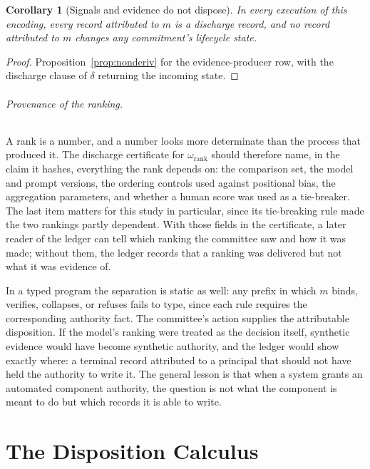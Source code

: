 \documentclass[11pt,openany]{book}
\newtheorem{corollary}[theorem]{Corollary}
\theoremstyle{remark}
\begin{document}
\begin{corollary}[Signals and evidence do not dispose]\label{prop:signals}
In every execution of this encoding, every record attributed to $m$ is a
discharge record, and no record attributed to $m$ changes any
commitment's lifecycle state.
\end{corollary}

\begin{proof}
Proposition~\ref{prop:nonderiv} for the evidence-producer row, with the
discharge clause of $\delta$ returning the incoming state.
\end{proof}

\paragraph{Provenance of the ranking.} A rank is a number, and a number
looks more determinate than the process that produced it. The discharge
certificate for $\omega_{\mathrm{rank}}$ should therefore name, in the
claim it hashes, everything the rank depends on: the comparison set, the
model and prompt versions, the ordering controls used against positional
bias, the aggregation parameters, and whether a human score was used as a
tie-breaker. The last item matters for this study in particular, since its
tie-breaking rule made the two rankings partly dependent. With those
fields in the certificate, a later reader of the ledger can tell which
ranking the committee saw and how it was made; without them, the ledger
records that a ranking was delivered but not what it was evidence of.

In a typed program the separation is static as well: any prefix in which
$m$ binds, verifies, collapses, or refuses fails to type, since each rule
requires the corresponding authority fact. The committee's action supplies
the attributable disposition. If the model's ranking were treated as the
decision itself, synthetic evidence would have become synthetic
authority, and the ledger would show exactly where: a terminal record
attributed to a principal that should not have held the authority to
write it. The general lesson is that when a system grants an automated
component authority, the question is not what the component is meant to
do but which records it is able to write.

\part{The Disposition Calculus}
\end{document}
